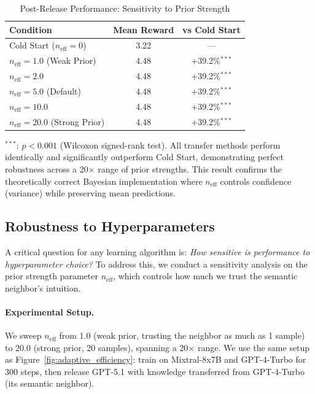 \begin{table}[t]
\centering
\caption{Post-Release Performance: Sensitivity to Prior Strength}
\label{tab:sensitivity}
\begin{tabular}{lcc}
\toprule
\textbf{Condition} & \textbf{Mean Reward} & \textbf{vs Cold Start} \\
\midrule
Cold Start ($n_{\text{eff}}=0$) & 3.22 & --- \\
\midrule
$n_{\text{eff}}=1.0$ (Weak Prior) & 4.48 & +39.2\%$^{***}$ \\
$n_{\text{eff}}=2.0$ & 4.48 & +39.2\%$^{***}$ \\
$n_{\text{eff}}=5.0$ (Default) & 4.48 & +39.2\%$^{***}$ \\
$n_{\text{eff}}=10.0$ & 4.48 & +39.2\%$^{***}$ \\
$n_{\text{eff}}=20.0$ (Strong Prior) & 4.48 & +39.2\%$^{***}$ \\
\bottomrule
\end{tabular}
\vspace{0.5em}
\footnotesize
$^{***}$: $p < 0.001$ (Wilcoxon signed-rank test). All transfer methods 
perform identically and significantly outperform Cold Start, demonstrating 
perfect robustness across a 20$\times$ range of prior strengths. This result 
confirms the theoretically correct Bayesian implementation where $n_{\text{eff}}$ 
controls confidence (variance) while preserving mean predictions.
\end{table}

\subsection{Robustness to Hyperparameters}
\label{sec:robustness}

A critical question for any learning algorithm is: \emph{How sensitive is performance 
to hyperparameter choice?} To address this, we conduct a sensitivity analysis on the 
prior strength parameter $n_{\text{eff}}$, which controls how much we trust the 
semantic neighbor's intuition.

\paragraph{Experimental Setup.}
We sweep $n_{\text{eff}}$ from 1.0 (weak prior, trusting the neighbor as much as 
1 sample) to 20.0 (strong prior, 20 samples), spanning a 20$\times$ range. We use 
the same setup as Figure~\ref{fig:adaptive_efficiency}: train on Mixtral-8x7B and 
GPT-4-Turbo for 300 steps, then release GPT-5.1 with knowledge transferred from 
GPT-4-Turbo (its semantic neighbor).

